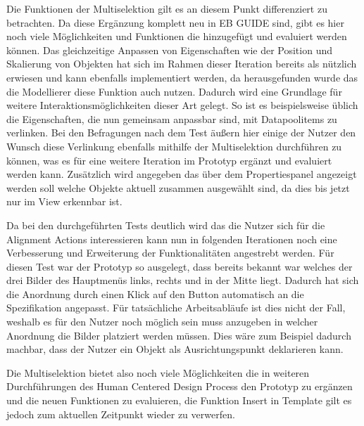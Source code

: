 Die Funktionen der Multiselektion gilt es an diesem Punkt differenziert zu betrachten.
Da diese Ergänzung komplett neu in EB GUIDE sind, gibt es hier noch viele Möglichkeiten und Funktionen die hinzugefügt und evaluiert werden können.
Das gleichzeitige Anpassen von Eigenschaften wie der Position und Skalierung von Objekten hat sich im Rahmen dieser Iteration bereits als nützlich erwiesen und kann ebenfalls implementiert werden, da herausgefunden wurde das die Modellierer diese Funktion auch nutzen.
Dadurch wird eine Grundlage für weitere Interaktionsmöglichkeiten dieser Art gelegt.
So ist es beispielsweise üblich die Eigenschaften, die nun gemeinsam anpassbar sind, mit Datapoolitems zu verlinken.
Bei den Befragungen nach dem Test äußern hier einige der Nutzer den Wunsch diese Verlinkung ebenfalls mithilfe der Multiselektion durchführen zu können, was es für eine weitere Iteration im Prototyp ergänzt und evaluiert werden kann.
Zusätzlich wird angegeben das über dem Propertiespanel angezeigt werden soll welche Objekte aktuell zusammen ausgewählt sind, da dies bis jetzt nur im View erkennbar ist.

Da bei den durchgeführten Tests deutlich wird das die Nutzer sich für die Alignment Actions interessieren kann nun in folgenden Iterationen noch eine Verbesserung und Erweiterung der Funktionalitäten angestrebt werden.
Für diesen Test war der Prototyp so ausgelegt, dass bereits bekannt war welches der drei Bilder des Hauptmenüs links, rechts und in der Mitte liegt.
Dadurch hat sich die Anordnung durch einen Klick auf den Button automatisch an die Spezifikation angepasst.
Für tatsächliche Arbeitsabläufe ist dies nicht der Fall, weshalb es für den Nutzer noch möglich sein muss anzugeben in welcher Anordnung die Bilder platziert werden müssen.
Dies wäre zum Beispiel dadurch machbar, dass der Nutzer ein Objekt als Ausrichtungspunkt deklarieren kann.

Die Multiselektion bietet also noch viele Möglichkeiten die in weiteren Durchführungen des Human Centered Design Process den Prototyp zu ergänzen und die neuen Funktionen zu evaluieren, die Funktion \glqq Insert in Template\grqq{} gilt es jedoch zum aktuellen Zeitpunkt wieder zu verwerfen.